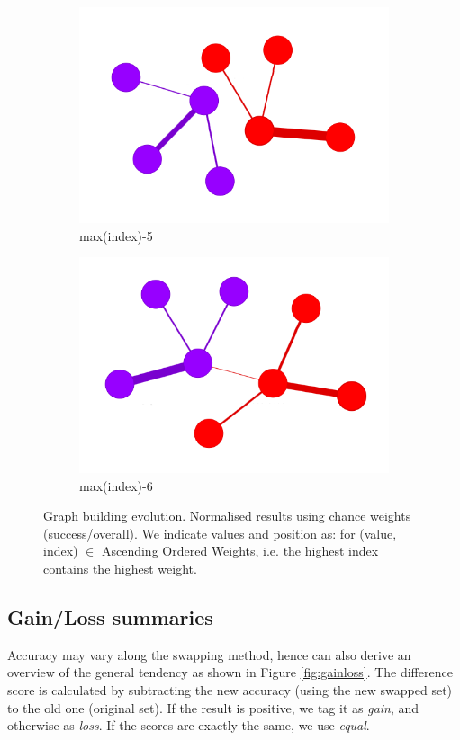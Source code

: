 \begin{figure}[!htb]
\begin{subfigure}[b]{0.13\linewidth}
		\includegraphics[width=\linewidth]{Minor Thesis/figures/graphs/sa/F.png}
		\caption{max(index)-5}
	\end{subfigure}
	\hfill
	\begin{subfigure}[b]{0.13\linewidth}
		\includegraphics[width=\linewidth]{Minor Thesis/figures/graphs/sa/G.png}
		\caption{max(index)-6}
	\end{subfigure}
	\caption{Graph building evolution. Normalised results using chance weights (success/overall). We indicate values and position as: for (value, index) $\in$ Ascending Ordered Weights, i.e. the highest index contains the highest weight.}
	\label{fig:graph-evo-sa}
\end{figure}
\FloatBarrier

\subsection{Gain/Loss summaries}
Accuracy may vary along the swapping method, hence can also derive an overview of the general tendency as shown in Figure \ref{fig:gainloss}. The difference score is calculated by subtracting the new accuracy (using the new swapped set) to the old one (original set). If the result is positive, we tag it as \emph{gain}, and otherwise as \emph{loss}. If the scores are exactly the same, we use \emph{equal}.

